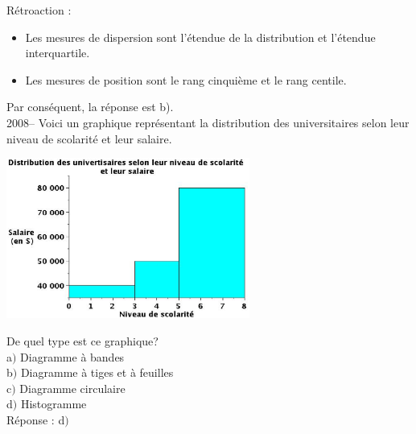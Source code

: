\documentclass[letterpaper, 12pt]{article}
\begin{document}
R\'etroaction :\\
\begin{itemize}
 \item Les mesures de dispersion sont l'\'etendue de la distribution et l'\'etendue interquartile. \\
\item Les mesures de position sont le rang cinqui\`eme et le rang centile.\\
\end{itemize}
Par cons\'equent, la r\'eponse est b).\\


2008-- Voici un graphique repr\'esentant la distribution des universitaires selon leur niveau de scolarit\'e et leur salaire.
\begin{center}
 \includegraphics[width=8cm,bb=14 14 611 415]{Q2008v.eps}
\end{center}

De quel type est ce graphique?\\
a$)$ Diagramme \`a bandes\\
b$)$ Diagramme \`a tiges et \`a feuilles\\
c$)$ Diagramme circulaire\\
d$)$ Histogramme\\

R\'eponse : d$)$\\
\end{document}
